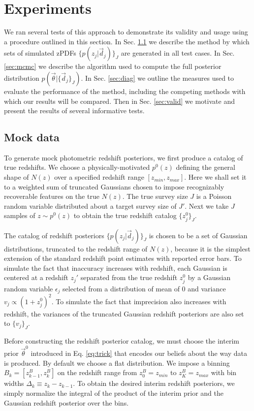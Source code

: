 \documentclass[preprint]{aastex}
\begin{document}
\section{Experiments}
\label{sec:exp}

We ran several tests of this approach to demonstrate its validity and usage 
using a procedure outlined in this section.  In Sec. \ref{sec:mock} we describe 
the method by which sets of simulated zPDFs $\{p(z_{j}|\vec{d}_{j})\}_{J}$ are 
generated in all test cases.  In Sec. \ref{sec:mcmc} we describe the algorithm 
used to compute the full posterior distribution 
$p(\vec{\theta}|\{\vec{d}_{j}\}_{J})$.  In Sec. \ref{sec:diag} we outline the 
measures used to evaluate the performance of the method, including the 
competing methods with which our results will be compared.  Then in Sec. 
\ref{sec:valid} we motivate and present the results of several informative 
tests.

\clearpage
\subsection{Mock data}
\label{sec:mock}

To generate mock photometric redshift posteriors, we first produce a catalog of 
true redshifts.  We choose a physically-motivated $p^{0}(z)$ defining the 
general shape of $N(z)$ over a specified redshift range $[z_{min},z_{max}]$.  
Here we shall set it to a weighted sum of truncated Gaussians chosen to impose 
recognizably recoverable features on the true $N(z)$.  The true survey size $J$ 
is a Poisson random variable distributed about a target survey size of $J'$.  
Next we take $J$ samples of $z\sim p^{0}(z)$ to obtain the true redshift 
catalog $\{z_{j}^{0}\}_{J}$.  

The catalog of redshift posteriors $\{p(z_{j}|\vec{d}_{j})\}_{J}$ is chosen to 
be a set of Gaussian distributions, truncated to the redshift range of $N(z)$, 
because it is the simplest extension of the standard redshift point estimates 
with reported error bars.  To simulate the fact that inaccuracy increases with 
redshift, each Gaussian is centered at a redshift $z_{j}'$ separated from the 
true redshift $z_{j}^{0}$ by a Gaussian random variable $\epsilon_{j}$ selected 
from a distribution of mean of 0 and variance $v_{j}\propto(1+z_{j}^{0})^{2}$.  
To simulate the fact that imprecision also increases with redshift, the 
variances of the truncated Gaussian redshift posteriors are also set to 
$\{v_{j}\}_{J}$.

Before constructing the redshift posterior catalog, we must choose the interim 
prior $\vec{\theta}^{0}$ introduced in Eq. \ref{eq:trick} that encodes our 
beliefs about the way data is produced.  By default we choose a flat 
distribution. We impose a binning $B_{k}=[z^{B}_{k-1},z^{B}_{k}]$ on the 
redshift range from $z^{B}_{0}=z_{min}$ to $z^{B}_{K}=z_{max}$ with bin widths 
$\Delta_{k}\equiv z_{k}-z_{k-1}$.  To obtain the desired interim redshift 
posteriors, we simply normalize the integral of the product of the interim 
prior and the Gaussian redshift posterior over the bins.  
\end{document}

